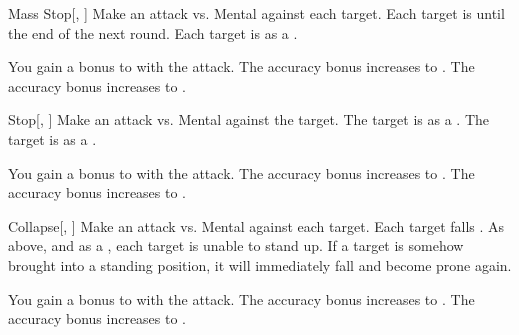 \lowercase{\hypertarget{spell:Mass Stop}{}}\label{spell:Mass Stop}
\begin{freeability}[Rank 1]{\hypertarget{spell:Mass Stop}{Mass Stop}}[, ]
Make an attack vs. Mental against each target.
\hit Each target is  until the end of the next round.
\crit Each target is  as a .

\rankline
{} You gain a  bonus to  with the attack.
 The accuracy bonus increases to .
 The accuracy bonus increases to .
\end{freeability}
\vspace{0.25em}



\lowercase{\hypertarget{spell:Stop}{}}\label{spell:Stop}
\begin{freeability}[Rank 1]{\hypertarget{spell:Stop}{Stop}}[, ]
Make an attack vs. Mental against the target.
\hit The target is  as a .
\crit The target is  as a .

\rankline
{} You gain a  bonus to  with the attack.
 The accuracy bonus increases to .
 The accuracy bonus increases to .
\end{freeability}
\vspace{0.25em}



\lowercase{\hypertarget{spell:Collapse}{}}\label{spell:Collapse}
\begin{freeability}[Rank 2]{\hypertarget{spell:Collapse}{Collapse}}[, ]
Make an attack vs. Mental against each target.
\hit Each target falls .
\crit As above, and as a , each target is unable to stand up.
If a target is somehow brought into a standing position, it will immediately fall and become prone again.

\rankline
{} You gain a  bonus to  with the attack.
 The accuracy bonus increases to .
 The accuracy bonus increases to .
\end{freeability}
\vspace{0.25em}



